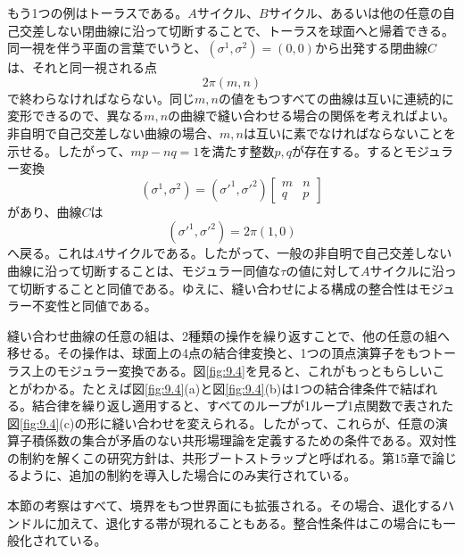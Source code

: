 もう1つの例はトーラスである。$A$サイクル、$B$サイクル、あるいは他の任意の自己交差しない閉曲線に沿って切断することで、トーラスを球面へと帰着できる。同一視を伴う平面の言葉でいうと、$(\sigma^1,\sigma^2)=(0,0)$から出発する閉曲線$C$は、それと同一視される点
\begin{equation}
 2\pi(m,n)
 \tag{9.4.10}\label{eq:9.4.10}
\end{equation}
で終わらなければならない。同じ$m,n$の値をもつすべての曲線は互いに連続的に変形できるので、異なる$m,n$の曲線で縫い合わせる場合の関係を考えればよい。非自明で自己交差しない曲線の場合、$m,n$は互いに素でなければならないことを示せる。したがって、$mp-nq=1$を満たす整数$p,q$が存在する。するとモジュラー変換
\begin{equation}
 (\sigma^1,\sigma^2)=(\sigma'^{1},\sigma'^{2})
 \begin{bmatrix}m&n\\q&p\end{bmatrix}
 \tag{9.4.11}\label{eq:9.4.11}
\end{equation}
があり、曲線$C$は
\begin{equation}
 (\sigma'^{1},\sigma'^{2})=2\pi(1,0)
 \tag{9.4.12}\label{eq:9.4.12}
\end{equation}
へ戻る。これは$A$サイクルである。したがって、一般の非自明で自己交差しない曲線に沿って切断することは、モジュラー同値な$\tau$の値に対して$A$サイクルに沿って切断することと同値である。ゆえに、縫い合わせによる構成の整合性はモジュラー不変性と同値である。

縫い合わせ曲線の任意の組は、2種類の操作を繰り返すことで、他の任意の組へ移せる。その操作は、球面上の4点の結合律変換と、1つの頂点演算子をもつトーラス上のモジュラー変換である。図\ref{fig:9.4}を見ると、これがもっともらしいことがわかる。たとえば図\ref{fig:9.4}(a)と図\ref{fig:9.4}(b)は1つの結合律条件で結ばれる。結合律を繰り返し適用すると、すべてのループが1ループ1点関数で表された図\ref{fig:9.4}(c)の形に縫い合わせを変えられる。したがって、これらが、任意の演算子積係数の集合が矛盾のない共形場理論を定義するための条件である。双対性の制約を解くこの研究方針は、共形ブートストラップと呼ばれる。第15章で論じるように、追加の制約を導入した場合にのみ実行されている。

本節の考察はすべて、境界をもつ世界面にも拡張される。その場合、退化するハンドルに加えて、退化する帯が現れることもある。整合性条件はこの場合にも一般化されている。

